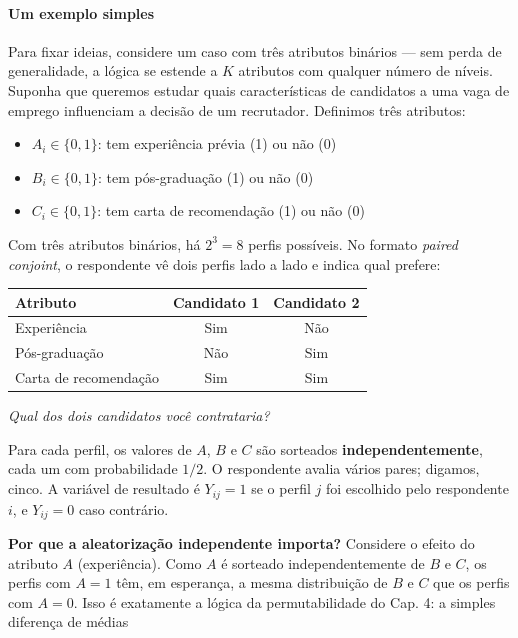 \documentclass[
]{article}
\providecommand{\tightlist}{%
  \setlength{\itemsep}{0pt}\setlength{\parskip}{0pt}}
\begin{document}
\paragraph{Um exemplo simples}\label{um-exemplo-simples}

Para fixar ideias, considere um caso com três atributos binários --- sem perda de generalidade, a lógica se estende a \(K\) atributos com qualquer número de níveis. Suponha que queremos estudar quais características de candidatos a uma vaga de emprego influenciam a decisão de um recrutador. Definimos três atributos:

\begin{itemize}
\tightlist
\item
  \(A_i \in \{0,1\}\): tem experiência prévia (1) ou não (0)
\item
  \(B_i \in \{0,1\}\): tem pós-graduação (1) ou não (0)
\item
  \(C_i \in \{0,1\}\): tem carta de recomendação (1) ou não (0)
\end{itemize}

Com três atributos binários, há \(2^3 = 8\) perfis possíveis. No formato \emph{paired conjoint}, o respondente vê dois perfis lado a lado e indica qual prefere:

\begin{longtable}[]{@{}lcc@{}}
\toprule\noalign{}
Atributo & Candidato 1 & Candidato 2 \\
\midrule\noalign{}
\endhead
\bottomrule\noalign{}
\endlastfoot
Experiência & Sim & Não \\
Pós-graduação & Não & Sim \\
Carta de recomendação & Sim & Sim \\
\end{longtable}

\emph{Qual dos dois candidatos você contrataria?}

Para cada perfil, os valores de \(A\), \(B\) e \(C\) são sorteados \textbf{independentemente}, cada um com probabilidade \(1/2\). O respondente avalia vários pares; digamos, cinco. A variável de resultado é \(Y_{ij} = 1\) se o perfil \(j\) foi escolhido pelo respondente \(i\), e \(Y_{ij} = 0\) caso contrário.

\textbf{Por que a aleatorização independente importa?} Considere o efeito do atributo \(A\) (experiência). Como \(A\) é sorteado independentemente de \(B\) e \(C\), os perfis com \(A=1\) têm, em esperança, a mesma distribuição de \(B\) e \(C\) que os perfis com \(A=0\). Isso é exatamente a lógica da permutabilidade do Cap. 4: a simples diferença de médias
\end{document}
